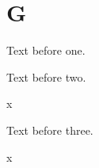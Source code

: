 \documentclass{closettwin}
\begin{document}
\mainmatter
\chapter{G}
Text before one.

Text before two.

\begin{insightbox}[L]x\end{insightbox}
Text before three.

\begin{insightbox}[L]x\end{insightbox}
\end{document}
